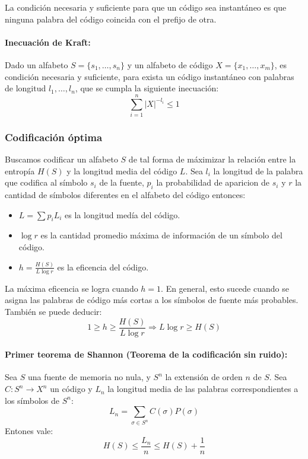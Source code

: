 La condición necesaria y suficiente para que un código sea instantáneo es que ninguna palabra del código coincida con el prefijo de otra.

\paragraph{Inecuación de Kraft:} Dado un alfabeto \(S = \{s_1,\dots,s_n\}\) y un alfabeto de código \(X=\{x_1,\dots,x_m\}\), es condición necesaria y suficiente, para exista un código instantáneo con palabras de longitud \(l_1,\dots,l_{n}\), que se cumpla la siguiente inecuación:
\[\sum_{i=1}^n |X|^{-l_i}\leq 1\]

\subsubsection{Codificación óptima}
Buscamos codificar un alfabeto \(S\) de tal forma de máximizar la relación entre la entropía \(H(S)\) y la longitud media del código \(L\).  Sea \(l_i\) la longitud de la palabra que codifica al símbolo \(s_i\) de la fuente, \(p_i\) la probabilidad de aparicion de \(s_i\) y \(r\) la cantidad de símbolos diferentes en el alfabeto del código entonces:

\begin{itemize}
  \item \(L = \sum p_iL_i \) es la longitud medía del código.
  \item \(\log r\) es la cantidad promedio máxima de información de un símbolo del código.
  \item \(h = \frac{H(S)}{L\log r}\) es la eficencia del código.
\end{itemize}

La máxima eficencia se logra cuando \(h = 1\). En general, esto sucede cuando se asigna las palabras de código más cortas a los símbolos de fuente más probables. También se puede deducir: \[1 \geq h \geq \frac{H(S)}{L\log r}\Rightarrow L\log r \geq H(S)\]

\paragraph{Primer teorema de Shannon (Teorema de la codificación sin ruido):} Sea \(S\) una fuente de memoria no nula, y \(S^n\) la extensión de orden \(n\) de \(S\).  Sea \(C:S^n\to X^n\) un código y \(L_n\) la longitud media de las palabras correspondientes a los símbolos de \(S^n\):
\[
    L_n = \sum_{\sigma\in S^n} C(\sigma)P(\sigma)
\]
Entones vale:
\[
    H(S) \leq \frac{L_n}{n} \leq H(S) + \frac{1}{n}
\]

